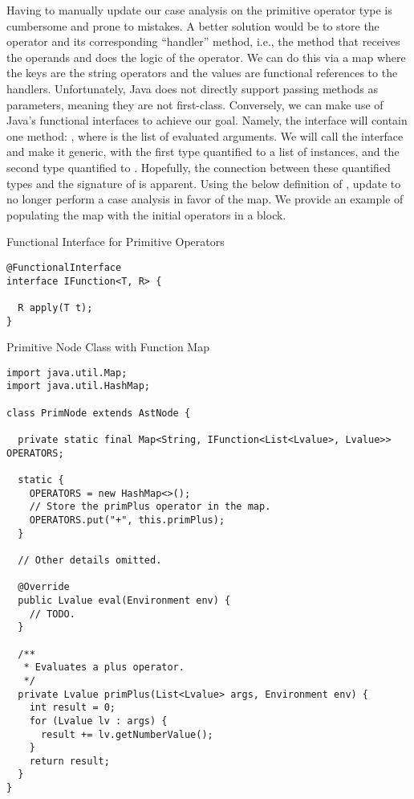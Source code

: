  Having to manually update our case analysis on the primitive operator type is cumbersome and prone to mistakes. A better solution would be to store the operator and its corresponding ``handler'' method, i.e., the method that receives the operands and does the logic of the operator. We can do this via a map where the keys are the string operators and the values are functional references to the handlers. Unfortunately, Java does not directly support passing methods as parameters, meaning they are not first-class. Conversely, we can make use of Java's functional interfaces to achieve our goal. Namely, the interface will contain one method: , where  is the list of evaluated arguments. We will call the interface  and make it generic, with the first type quantified to a list of  instances, and the second type quantified to . Hopefully, the connection between these quantified types and the signature of  is apparent. Using the below definition of , update  to no longer perform a case analysis in favor of the map. We provide an example of populating the map with the initial operators in a  block.

\begin{cl}[]{Functional Interface for Primitive Operators}
\begin{lstlisting}[language=MyJava]
@FunctionalInterface
interface IFunction<T, R> {
  
  R apply(T t);
}
\end{lstlisting}
\end{cl}

\begin{cl}{Primitive Node Class with Function Map}
\begin{lstlisting}[language=MyJava]
import java.util.Map;
import java.util.HashMap;

class PrimNode extends AstNode {
  
  private static final Map<String, IFunction<List<Lvalue>, Lvalue>> OPERATORS;
  
  static {
    OPERATORS = new HashMap<>();
    // Store the primPlus operator in the map.
    OPERATORS.put("+", this.primPlus);
  }

  // Other details omitted.

  @Override
  public Lvalue eval(Environment env) {
    // TODO.
  }

  /**
   * Evaluates a plus operator.
   */
  private Lvalue primPlus(List<Lvalue> args, Environment env) {
    int result = 0;
    for (Lvalue lv : args) {
      result += lv.getNumberValue();
    }
    return result;
  }
}
\end{lstlisting}
\end{cl}

